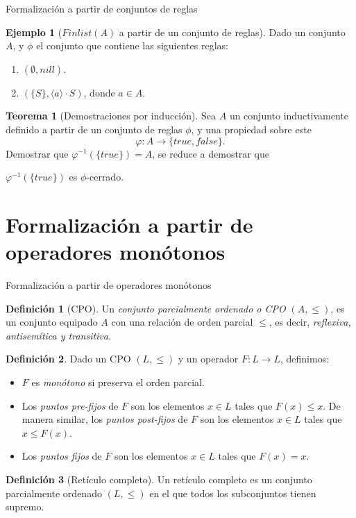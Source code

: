 \documentclass[dvipsnames, 8pt]{beamer} %
\theoremstyle{plain}
\theoremstyle{definition}
\newtheorem{teo}{Teorema}
\newtheorem{defi}{Definición}
\newtheorem{ejemplo}{Ejemplo}
\begin{document}
\begin{frame}{Formalización a partir de conjuntos de reglas}
    \begin{ejemplo}[$Finlist(A)$ a partir de un conjunto de reglas]
        Dado un conjunto $A$, y $\phi$ el conjunto que contiene las siguientes reglas:
        \begin{enumerate}
            \item $(\emptyset, nill)$.\pause
            \item $(\{S\},\langle a \rangle\cdot S)$, donde $a \in A$.
        \end{enumerate}\pause
    \end{ejemplo}
    \begin{teo}[Demostraciones por inducción]
        Sea $A$ un conjunto inductivamente definido a partir de un conjunto de reglas $\phi$, y una propiedad sobre este 
        $$\varphi : A \rightarrow \{true, false\}.$$ 
        Demostrar que $\varphi^{-1}(\{true\}) = A$, se reduce a demostrar que 
        \begin{center}
            $\varphi^{-1}(\{true\})$ es $\phi$-cerrado.
        \end{center}
    \end{teo}
\end{frame}

\section{Formalización a partir de operadores monótonos}
\begin{frame}{Formalización a partir de operadores monótonos}
    \begin{defi}[CPO]
        Un \emph{conjunto parcialmente ordenado o CPO} $(A,\leq)$, es un conjunto equipado $A$ con una relación de orden parcial $\leq$, es decir, \emph{reflexiva, antisemítica y transitiva}.
    \end{defi}\pause

    \begin{defi}
        Dado un CPO $(L, \leq)$ y un operador $F: L \rightarrow L$, definimos:\pause
        \begin{itemize}
            \item $F$ es \emph{monótono} si preserva el orden parcial.\pause
            \item Los \emph{puntos pre-fijos} de $F$ son los elementos $x \in L$ tales que $F(x) \leq x$. De manera similar, los \emph{puntos post-fijos} de $F$ son los elementos $x \in L$ tales que $x \leq F(x)$.\pause
            \item Los \emph{puntos fijos} de $F$ son los elementos $x \in L$ tales que $F(x) = x$.
        \end{itemize}
    \end{defi}\pause
    \begin{defi}[Retículo completo]
        Un retículo completo es un conjunto parcialmente ordenado $(L,\leq)$ en el que todos los subconjuntos tienen supremo.\pause
    \end{defi}
\end{frame}
\end{document}
